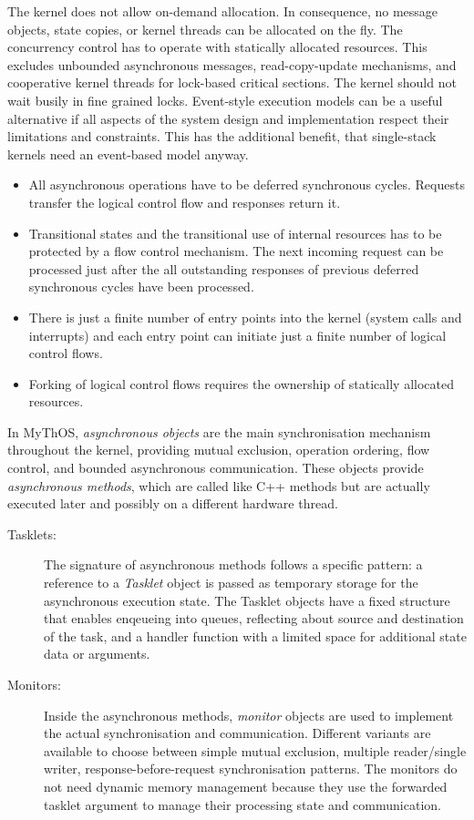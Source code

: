 The \mythos kernel does not allow on-demand allocation. In consequence, no message objects, state copies, or kernel threads can be allocated on the fly. The concurrency control has to operate with statically allocated resources. This excludes unbounded asynchronous messages, read-copy-update mechanisms, and cooperative kernel threads for lock-based critical sections. The kernel should not wait busily in fine grained locks. Event-style execution models can be a useful alternative if all aspects of the system design and implementation respect their limitations and constraints. This has the additional benefit, that single-stack kernels need an event-based model anyway.   

\begin{itemize}
\item All asynchronous operations have to be deferred synchronous cycles. Requests transfer the logical control flow and responses return it.
\item Transitional states and the transitional use of internal resources has to be protected by a flow control mechanism. The next incoming request can be processed just after the all outstanding responses of previous deferred synchronous cycles have been processed.
\item There is just a finite number of entry points into the kernel (system calls and interrupts) and each entry point can initiate just a finite number of logical control flows.
\item Forking of logical control flows requires the ownership of statically allocated resources.
\end{itemize}

In MyThOS, \emph{asynchronous objects} are the main synchronisation mechanism throughout the kernel, providing mutual exclusion, operation ordering, flow control, and bounded asynchronous communication. These objects provide \emph{asynchronous methods}, which are called like C++ methods but are actually executed later and possibly on a different hardware thread.

\begin{description}
\item[Tasklets:] 
The signature of asynchronous methods follows a specific pattern: a reference to a \emph{Tasklet} object is passed as temporary storage for the asynchronous execution state. The Tasklet objects have a fixed structure that enables enqeueing into queues, reflecting about source and destination of the task, and a handler function with a limited space for additional state data or arguments.

\item[Monitors:] 
Inside the asynchronous methods, \emph{monitor} objects are used to implement the actual synchronisation and communication. Different variants are available to choose between simple mutual exclusion, multiple reader/single writer, response-before-request synchronisation patterns. The monitors do not need dynamic memory management because they use the forwarded tasklet argument to manage their processing state and communication. 
\end{description}

